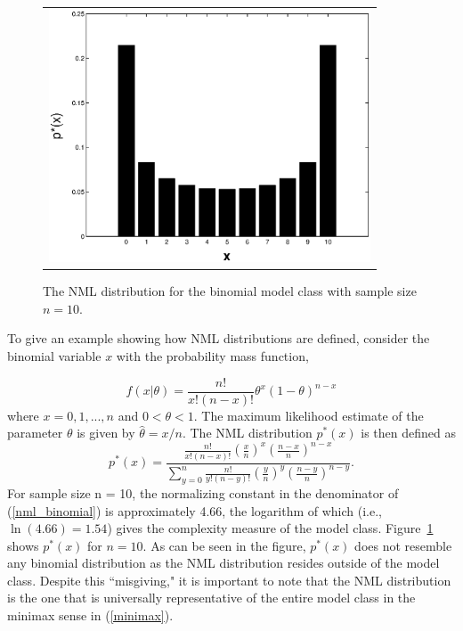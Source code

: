 \documentclass{elsart}
\newcommand{\efc}{\vspace*{15pt}}
\begin{document}
\begin{figure}[t]
   \begin{center}
   \begin{tabular}{c}
  \includegraphics[height=7.5cm]{nml_dist.eps}
   \end{tabular}
   \end{center}
   \caption{The NML distribution for the binomial model class with sample size $n = 10$.}
 \label{nml_dist}
\efc
\end{figure}

To give an example showing how NML distributions are defined, consider the binomial variable $x$
with the probability mass function,

\begin{equation}\label{binomial}
f(x|\theta)=\frac{n!}{x!(n-x)!} \theta^x (1-\theta)^{n-x}
\end{equation}
where $x = 0,1,...,n$ and $0 < \theta < 1$. The maximum likelihood estimate of the parameter
$\theta$ is given by $\hat{\theta} = x/n$. The NML distribution $p^*(x)$ is then defined as
\begin{equation}\label{nml_binomial}
p^*(x) =\frac{ \frac{n!}{x!(n-x)!} {\left( \frac{x}{n} \right)}^x {\left(
\frac{n-x}{n}\right)}^{n-x}} {\sum_{y=0}^{n} \frac{n!}{y!(n-y)!} {\left( \frac{y}{n} \right)}^y
{\left( \frac{n-y}{n}\right)}^{n-y}}.
\end{equation}
For sample size n = 10, the normalizing constant in the denominator of (\ref{nml_binomial}) is
approximately 4.66, the logarithm of which (i.e., $\ln(4.66) = 1.54$) gives the complexity measure
of the model class. Figure~\ref{nml_dist} shows $p^*(x)$ for $n=10$. As can be seen in the figure,
$p^*(x)$ does not resemble any binomial distribution as the NML distribution resides outside of
the model class. Despite this ``misgiving," it is important to note that the NML distribution is
the one that is universally representative of the entire model class in the minimax sense in
(\ref{minimax}).
\end{document}
